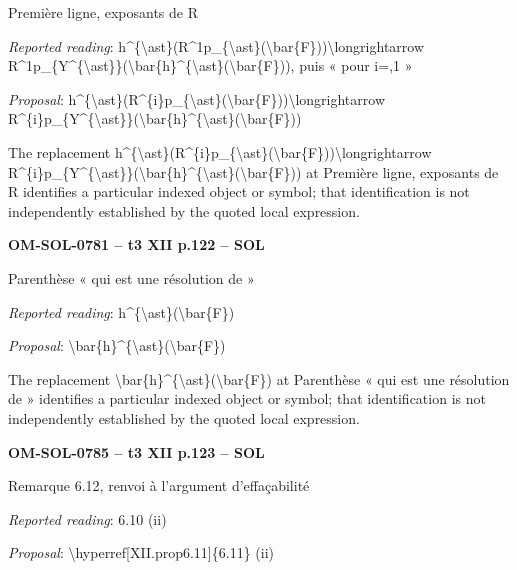Première ligne, exposants de R\par
\emph{Reported reading}: h\textasciicircum{}\{\textbackslash{}ast\}(R\textasciicircum{}1p\_\{\textbackslash{}ast\}(\textbackslash{}bar\{F\}))\textbackslash{}longrightarrow R\textasciicircum{}1p\_\{Y\textasciicircum{}\{\textbackslash{}ast\}\}(\textbackslash{}bar\{h\}\textasciicircum{}\{\textbackslash{}ast\}(\textbackslash{}bar\{F\})), puis « pour i=,1 »\par
\emph{Proposal}: h\textasciicircum{}\{\textbackslash{}ast\}(R\textasciicircum{}\{i\}p\_\{\textbackslash{}ast\}(\textbackslash{}bar\{F\}))\textbackslash{}longrightarrow R\textasciicircum{}\{i\}p\_\{Y\textasciicircum{}\{\textbackslash{}ast\}\}(\textbackslash{}bar\{h\}\textasciicircum{}\{\textbackslash{}ast\}(\textbackslash{}bar\{F\}))\par
The replacement h\textasciicircum{}\{\textbackslash{}ast\}(R\textasciicircum{}\{i\}p\_\{\textbackslash{}ast\}(\textbackslash{}bar\{F\}))\textbackslash{}longrightarrow R\textasciicircum{}\{i\}p\_\{Y\textasciicircum{}\{\textbackslash{}ast\}\}(\textbackslash{}bar\{h\}\textasciicircum{}\{\textbackslash{}ast\}(\textbackslash{}bar\{F\})) at Première ligne, exposants de R identifies a particular indexed object or symbol; that identification is not independently established by the quoted local expression.\par
\par\noindent\textbf{OM-SOL-0781 -- t3 XII p.122 -- SOL}\par
Parenthèse « qui est une résolution de »\par
\emph{Reported reading}: h\textasciicircum{}\{\textbackslash{}ast\}(\textbackslash{}bar\{F\})\par
\emph{Proposal}: \textbackslash{}bar\{h\}\textasciicircum{}\{\textbackslash{}ast\}(\textbackslash{}bar\{F\})\par
The replacement \textbackslash{}bar\{h\}\textasciicircum{}\{\textbackslash{}ast\}(\textbackslash{}bar\{F\}) at Parenthèse « qui est une résolution de » identifies a particular indexed object or symbol; that identification is not independently established by the quoted local expression.\par
\par\noindent\textbf{OM-SOL-0785 -- t3 XII p.123 -- SOL}\par
Remarque 6.12, renvoi à l'argument d'effaçabilité\par
\emph{Reported reading}: 6.10 (ii)\par
\emph{Proposal}: \textbackslash{}hyperref[XII.prop6.11]\{6.11\} (ii)\par
